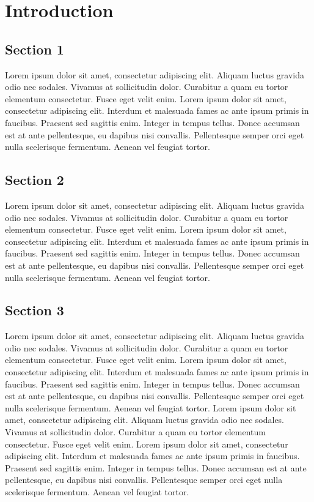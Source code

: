 \chapter{Introduction}

\section{Section 1}
Lorem ipsum dolor sit amet, consectetur adipiscing elit. Aliquam luctus gravida odio nec sodales. Vivamus at sollicitudin dolor. Curabitur a quam eu tortor elementum consectetur. Fusce eget velit enim. Lorem ipsum dolor sit amet, consectetur adipiscing elit. Interdum et malesuada fames ac ante ipsum primis in faucibus. Praesent sed sagittis enim. Integer in tempus tellus. Donec accumsan est at ante pellentesque, eu dapibus nisi convallis. Pellentesque semper orci eget nulla scelerisque fermentum. Aenean vel feugiat tortor.

\thispagestyle{fancy}

\section{Section 2}
Lorem ipsum dolor sit amet, consectetur adipiscing elit. Aliquam luctus gravida odio nec sodales. Vivamus at sollicitudin dolor. Curabitur a quam eu tortor elementum consectetur. Fusce eget velit enim. Lorem ipsum dolor sit amet, consectetur adipiscing elit. Interdum et malesuada fames ac ante ipsum primis in faucibus. Praesent sed sagittis enim. Integer in tempus tellus. Donec accumsan est at ante pellentesque, eu dapibus nisi convallis. Pellentesque semper orci eget nulla scelerisque fermentum. Aenean vel feugiat tortor.

\thispagestyle{fancy}

\section{Section 3}
Lorem ipsum dolor sit amet, consectetur adipiscing elit. Aliquam luctus gravida odio nec sodales. Vivamus at sollicitudin dolor. Curabitur a quam eu tortor elementum consectetur. Fusce eget velit enim. Lorem ipsum dolor sit amet, consectetur adipiscing elit. Interdum et malesuada fames ac ante ipsum primis in faucibus. Praesent sed sagittis enim. Integer in tempus tellus. Donec accumsan est at ante pellentesque, eu dapibus nisi convallis. Pellentesque semper orci eget nulla scelerisque fermentum. Aenean vel feugiat tortor.
Lorem ipsum dolor sit amet, consectetur adipiscing elit. Aliquam luctus gravida odio nec sodales. Vivamus at sollicitudin dolor. Curabitur a quam eu tortor elementum consectetur. Fusce eget velit enim. Lorem ipsum dolor sit amet, consectetur adipiscing elit. Interdum et malesuada fames ac ante ipsum primis in faucibus. Praesent sed sagittis enim. Integer in tempus tellus. Donec accumsan est at ante pellentesque, eu dapibus nisi convallis. Pellentesque semper orci eget nulla scelerisque fermentum. Aenean vel feugiat tortor.

